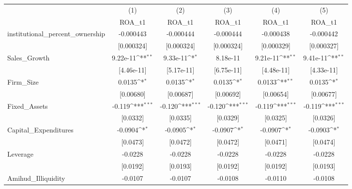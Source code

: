 {
\def\sym#1{\ifmmode^{#1}\else\(^{#1}\)\fi}
\begin{tabular}{l*{5}{c}}
\hline\hline
            &\multicolumn{1}{c}{(1)}&\multicolumn{1}{c}{(2)}&\multicolumn{1}{c}{(3)}&\multicolumn{1}{c}{(4)}&\multicolumn{1}{c}{(5)}\\
            &\multicolumn{1}{c}{ROA\_t1}&\multicolumn{1}{c}{ROA\_t1}&\multicolumn{1}{c}{ROA\_t1}&\multicolumn{1}{c}{ROA\_t1}&\multicolumn{1}{c}{ROA\_t1}\\
\hline
institutional\_percent\_ownership&   -0.000443         &   -0.000444         &   -0.000444         &   -0.000438         &   -0.000442         \\
            &  [0.000324]         &  [0.000324]         &  [0.000324]         &  [0.000329]         &  [0.000327]         \\
[1em]
Sales\_Growth&    9.22e-11\sym{**} &    9.33e-11\sym{*}  &    8.18e-11         &    9.21e-11\sym{**} &    9.41e-11\sym{**} \\
            &  [4.46e-11]         &  [5.17e-11]         &  [6.75e-11]         &  [4.48e-11]         &  [4.33e-11]         \\
[1em]
Firm\_Size   &      0.0135\sym{*}  &      0.0135\sym{*}  &      0.0135\sym{*}  &      0.0133\sym{**} &      0.0135\sym{*}  \\
            &   [0.00680]         &   [0.00687]         &   [0.00692]         &   [0.00654]         &   [0.00677]         \\
[1em]
Fixed\_Assets&      -0.119\sym{***}&      -0.120\sym{***}&      -0.120\sym{***}&      -0.119\sym{***}&      -0.119\sym{***}\\
            &    [0.0332]         &    [0.0335]         &    [0.0329]         &    [0.0325]         &    [0.0326]         \\
[1em]
Capital\_Expenditures&     -0.0904\sym{*}  &     -0.0905\sym{*}  &     -0.0907\sym{*}  &     -0.0907\sym{*}  &     -0.0903\sym{*}  \\
            &    [0.0473]         &    [0.0472]         &    [0.0472]         &    [0.0471]         &    [0.0474]         \\
[1em]
Leverage    &     -0.0228         &     -0.0228         &     -0.0228         &     -0.0228         &     -0.0228         \\
            &    [0.0192]         &    [0.0193]         &    [0.0192]         &    [0.0192]         &    [0.0193]         \\
[1em]
Amihud\_Illiquidity&     -0.0107         &     -0.0107         &     -0.0108         &     -0.0110         &     -0.0108         \\

\end{tabular}}
